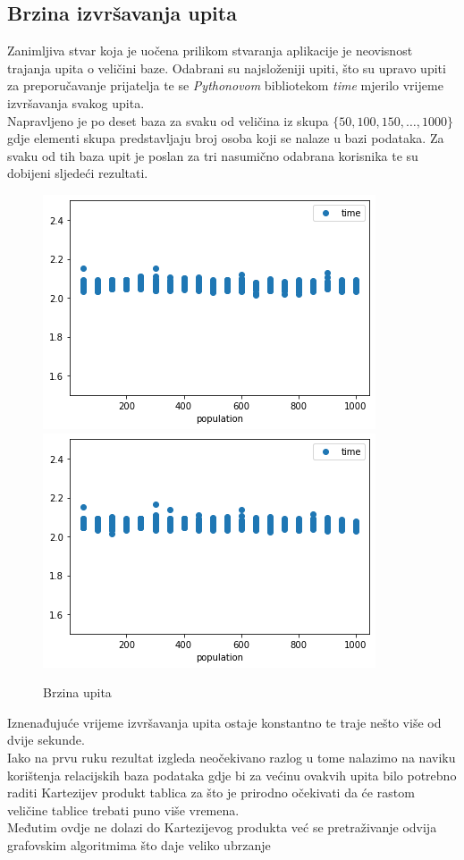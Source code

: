 \documentclass[titlepage, 12pt]{scrartcl}
\begin{document}
	\subsection{Brzina izvršavanja upita}
	Zanimljiva stvar koja je uočena prilikom stvaranja aplikacije je neovisnost trajanja upita o veličini baze. Odabrani su najsloženiji upiti, što su upravo upiti za preporučavanje prijatelja te se \emph{Pythonovom} bibliotekom \emph{time} mjerilo vrijeme izvršavanja svakog upita. \\
	Napravljeno je po deset baza za svaku od veličina iz skupa $\{50, 100, 150, \dots, 1000\}$ gdje elementi skupa predstavljaju broj osoba koji se nalaze u bazi podataka. Za svaku od tih baza upit je poslan za tri nasumično odabrana korisnika te su dobijeni sljedeći rezultati.\\
	
	\begin{figure}[h]
		\centering
		\includegraphics[scale=0.5]{slike/personal_graph.png}
		\includegraphics[scale=0.5]{slike/business_graph.png}
		\caption{Brzina upita}
		\label{fig:query_speed}
	\end{figure}
	
	
	Iznenađujuće vrijeme izvršavanja upita ostaje konstantno te traje nešto više od dvije sekunde. \\
	Iako na prvu ruku rezultat izgleda neočekivano razlog u tome nalazimo na naviku korištenja relacijskih baza podataka gdje bi za većinu ovakvih upita bilo potrebno raditi Kartezijev produkt tablica za što je prirodno očekivati da će rastom veličine tablice trebati puno više vremena. \\
	Međutim ovdje ne dolazi do Kartezijevog produkta već se pretraživanje odvija grafovskim algoritmima što daje veliko ubrzanje 
	
\end{document}
